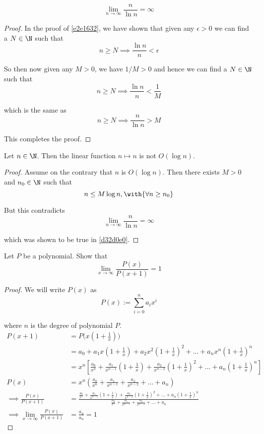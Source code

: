 \label{d32d0e0}

$$
  \lim_{n\to\infty}\frac n{\ln n}=\infty
$$

\begin{proof}
  In the proof of \autoref{e2e1632}, we have shown that given any
  $\epsilon>0$ we can find a $N\in\N$ such that
  $$
    n\geq N\implies\frac{\ln n}n<\epsilon
  $$

  So then now given any $M>0$, we have $1/M>0$ and hence we can find a $N\in\N$
  such that
  $$
    n\geq N\implies\frac{\ln n}n<\frac1M
  $$

  which is the same as
  $$
    n\geq N\implies\frac n{\ln n}>M
  $$

  This completes the proof.
\end{proof}

\label{d4be35c}

Let $n\in\N$. Then the linear function $n\mapsto n$ is not $O(\log n)$.

\begin{proof}
  Assume on the contrary that $n$ is $O(\log n)$. Then there exists $M>0$ and
  $n_0\in\N$ such that
  $$
    n\leq M\log n,\with{\forall n\geq n_0}
  $$

  But this contradicts
  $$
    \lim_{n\to\infty}\frac n{\ln n}=\infty
  $$

  which was shown to be true in \autoref{d32d0e0}.
\end{proof}

\label{b63d815}

Let $P$ be a polynomial. Show that
$$
  \lim_{x\to\infty}\frac{P(x)}{P(x+1)}=1
$$

\begin{proof}
  \def\one{\left(1+\frac1x\right)}
  We will write $P(x)$ as
  $$
    P(x):=\sum_{i=0}^n a_ix^i
  $$

  where $n$ is the degree of polynomial $P$.
  \begin{align*}
    P(x+1)
     &=P\bigl(x(1+\tfrac1x)\bigr)                                                                         \\
     &=a_0+a_1x\one+a_2x^2\one^2+\ldots+a_nx^n\one^n                                                      \\
     &=x^n\left[\frac{a_0}{x^n}+\frac{a_1}{x^{n-1}}\one+\frac{a_2}{x^{n-2}}\one^2+\ldots+a_n\one^n\right] \\[0.5em]
    P(x)
     &=x^n\left(\frac{a_0}{x^n}+\frac{a_1}{x^{n-1}}+\frac{a_2}{x^{n-2}}+\ldots+a_n\right)                 \\[0.5em]
    \implies \frac{P(x)}{P(x+1)}
     &=\frac
    {\frac{a_0}{x^n}+\frac{a_1}{x^{n-1}}\one+\frac{a_2}{x^{n-2}}\one^2+\ldots+a_n\one^n}
    {\frac{a_0}{x^n}+\frac{a_1}{x^{n-1}}+\frac{a_2}{x^{n-2}}+\ldots+a_n}                                  \\[0.5em]
    \implies \lim_{x\to\infty}\frac{P(x)}{P(x+1)}
     &=\frac{a_n}{a_n} = 1
  \end{align*}
\end{proof}

